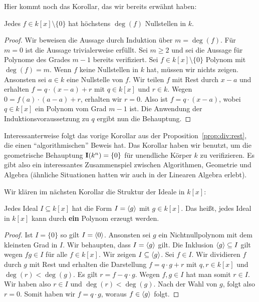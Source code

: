 \documentclass[11pt]{article}
\numberwithin{equation}{section}
\begin{document}
Hier kommt noch das Korollar, das wir bereits erwähnt haben: 
\begin{corollary}
	Jedes $f \in k[x] \setminus \{0\}$ hat höchstens $\deg(f)$ Nullstellen in $k$. 
\end{corollary} 
\begin{proof} 
	Wir beweisen die Aussage durch Induktion über $m = \deg(f)$. Für $m=0$ ist die Aussage trivialerweise erfüllt. Sei $m \ge 2$ und sei die Aussage für Polynome des Grades $m-1$ bereits verifiziert. Sei $f \in k[x] \setminus \{0\}$ Polynom mit $\deg(f) =m$. Wenn $f$ keine Nullstellen in $k$ hat, müssen wir nichts zeigen. Ansonsten sei $a \in k$ eine Nullstelle von $f$. Wir teilen $f$ mit Rest durch $x-a$ und erhalten $f = q \cdot (x-a) + r$ mit $q \in k[x]$ und $r \in k$. Wegen $0=f(a) \cdot (a-a) + r$, erhalten wir $r=0$. Also ist $f = q \cdot (x-a)$, wobei $q \in k[x]$ ein Polynom vom Grad $m-1$ ist. Die Anwendung der Induktionsvoraussetzung zu $q$ ergibt nun die Behauptung. 
\end{proof} 

Interessanterweise folgt das vorige Korollar aus der Proposition~\ref{prop:div:rest}, die einen ``algorithmischen'' Beweis hat. Das Korollar haben wir benutzt, um die geometrische Behauptung $\mathbf{I}(k^n) = \{0\}$ für unendliche Körper $k$ zu verifizieren. Es gibt also ein interessantes Zusammenspiel zwischen Algorithmen, Geometrie und Algebra (ähnliche Situationen hatten wir auch in der Linearen Algebra erlebt). 

Wir klären im nächsten Korollar die Struktur der Ideale in $k[x]$: 

\begin{corollary} \label{cor:pid}
		Jedes Ideal $I \subseteq k[x]$ hat die Form $I = \left< g \right>$ mit $g \in k[x]$. Das heißt, jedes Ideal in $k[x]$ kann durch \textbf{ein} Polynom erzeugt werden. 
\end{corollary} 
\begin{proof} 
	Ist $I = \{0\}$ so gilt $I = \left< 0 \right>$. Ansonsten sei $g$ ein Nichtnullpolynom mit dem kleinsten Grad in $I$. Wir behaupten, dass $I = \left< g \right>$ gilt. Die Inklusion $\left< g \right>  \subseteq I$ gilt wegen $fg\in I$ für alle $f \in k[x]$. Wir zeigen $I \subseteq \left< g \right>$. Sei $f \in I$. Wir dividieren $f$ durch $g$ mit Rest und erhalten die Darstellung $f = q \cdot g + r$ mit $q,r \in k[x]$ und $\deg(r) < \deg(g)$. Es gilt $r = f - q \cdot g$. Wegen $f, g \in I$ hat man somit $r \in I$.  Wir haben also $r \in I$ und $\deg(r)< \deg(g)$. Nach der Wahl von $g$, folgt also $r=0$. Somit haben wir $f = q \cdot g$, woraus $f \in \left< g \right>$ folgt. 
\end{proof} 
\end{document}
